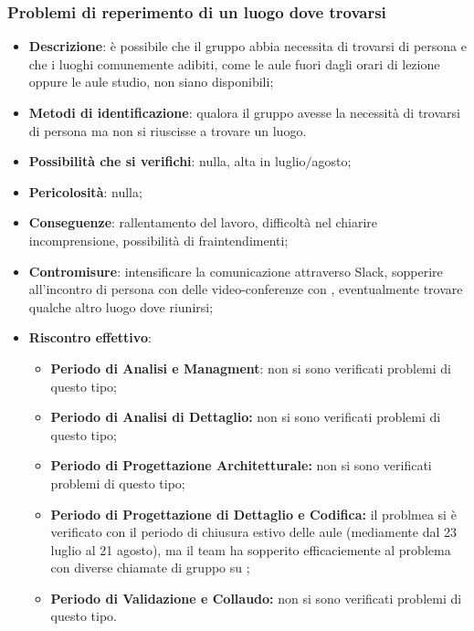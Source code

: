       \subsubsection{Problemi di reperimento di un luogo dove trovarsi}
		\begin{itemize}
			\item \textbf{Descrizione}: è possibile che il gruppo abbia necessita di trovarsi di persona e che i luoghi comunemente adibiti, come le aule fuori dagli orari di lezione oppure le aule studio, non siano disponibili;
			\item \textbf{Metodi di identificazione}: qualora il gruppo avesse la necessità di trovarsi di persona ma non si riuscisse a trovare un luogo.
			\item \textbf{Possibilità che si verifichi}: nulla, alta in luglio$/$agosto;
			\item \textbf{Pericolosità}: nulla;
			\item \textbf{Conseguenze}: rallentamento del lavoro, difficoltà nel chiarire incomprensione, possibilità di fraintendimenti;
			\item \textbf{Contromisure}: intensificare la comunicazione attraverso Slack, sopperire all'incontro di persona con delle video-conferenze con , eventualmente trovare qualche altro luogo dove riunirsi;
			\item \textbf{Riscontro effettivo}:
			\begin{itemize}
				\item \textbf{Periodo di Analisi e Managment}: non si sono verificati problemi di questo tipo;
				\item \textbf{Periodo di Analisi di Dettaglio:} non si sono verificati problemi di questo tipo;
				\item \textbf{Periodo di Progettazione Architetturale:} non si sono verificati problemi di questo tipo;
            \item \textbf{Periodo di Progettazione di Dettaglio e Codifica:} il problmea si è verificato con il periodo di chiusura estivo delle aule (mediamente dal 23 luglio al 21 agosto), ma il team ha sopperito efficaciemente al problema con diverse chiamate di gruppo su ;
            \item \textbf{Periodo di Validazione e Collaudo:} non si sono verificati problemi di questo tipo.
			\end{itemize}
		\end{itemize}
